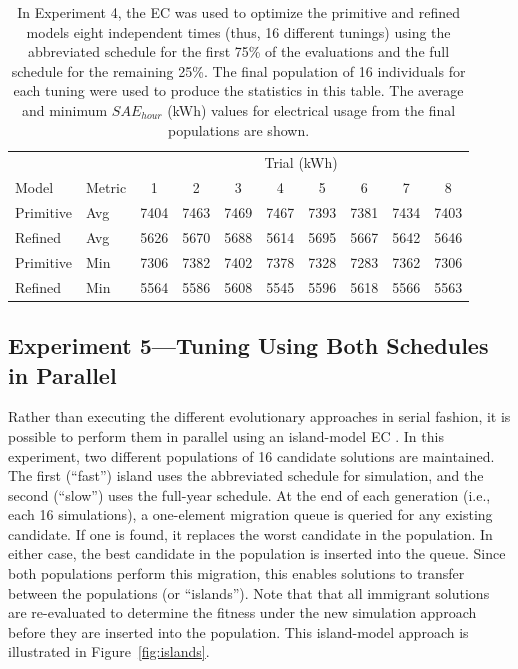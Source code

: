 \documentclass[preprint, review, 12pt]{elsarticle}
\begin{document}
\begin{table}[htbp]
\centering
\caption{In Experiment 4, the EC was used to optimize the primitive and refined models eight independent times (thus, 16 different tunings) using the abbreviated schedule for the first 75\% of the evaluations and the full schedule for the remaining 25\%. The final population of 16 individuals for each tuning were used to produce the statistics in this table. The average and minimum $SAE_{hour}$ (kWh) values for electrical usage from the final populations are shown.}
\label{tab:hourly-serial}
\begin{tabular}{llcccccccc}
\toprule
 &  & \multicolumn{8}{c}{Trial (kWh)}\\
Model & Metric & 1 & 2 & 3 & 4 & 5 & 6 & 7 & 8\\
\midrule
Primitive & Avg & 7404 & 7463 & 7469 & 7467 & 7393 & 7381 & 7434 & 7403\\\rowcolor{DarkRow}
Refined   & Avg & 5626 & 5670 & 5688 & 5614 & 5695 & 5667 & 5642 & 5646\\
Primitive & Min & 7306 & 7382 & 7402 & 7378 & 7328 & 7283 & 7362 & 7306\\\rowcolor{DarkRow}
Refined   & Min & 5564 & 5586 & 5608 & 5545 & 5596 & 5618 & 5566 & 5563\\
\bottomrule
\end{tabular}
\end{table}

\subsection{Experiment 5---Tuning Using Both Schedules in Parallel}
\label{sub:experiment5}
Rather than executing the different evolutionary approaches in serial fashion, it is possible to perform them in parallel using an island-model EC \cite{cit:eiben2007}. In this experiment, two different populations of 16 candidate solutions are maintained. The first (``fast'') island uses the abbreviated schedule for simulation, and the second (``slow'') uses the full-year schedule. At the end of each generation (i.e., each 16 simulations), a one-element migration queue is queried for any existing candidate. If one is found, it replaces the worst candidate in the population. In either case, the best candidate in the population is inserted into the queue. Since both populations perform this migration, this enables solutions to transfer between the populations (or ``islands''). Note that that all immigrant solutions are re-evaluated to determine the fitness under the new simulation approach before they are inserted into the population. This island-model approach is illustrated in Figure~\ref{fig:islands}.
\end{document}
